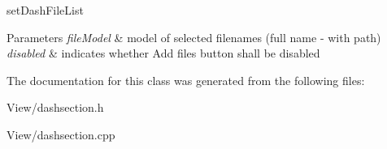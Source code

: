 set\-Dash\-File\-List 


\begin{DoxyParams}{Parameters}
{\em file\-Model} & model of selected filenames (full name -\/ with path) \\
\hline
{\em disabled} & indicates whether Add files button shall be disabled \\
\hline
\end{DoxyParams}


The documentation for this class was generated from the following files\-:\begin{DoxyCompactItemize}
\item 
View/dashsection.\-h\item 
View/dashsection.\-cpp\end{DoxyCompactItemize}
